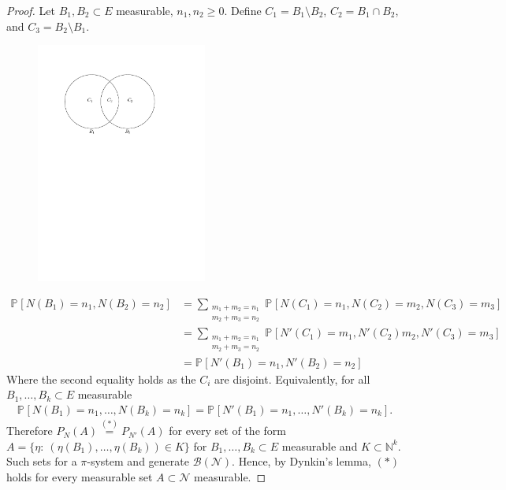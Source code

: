 \begin{proof}
Let $B_1,B_2 \subset E$ measurable, $n_1,n_2\geq 0$. Define $C_1 = B_1 \setminus B_2$, $C_2 = B_1 \cap B_2$, and $C_3= B_2 \setminus B_1$. 

\begin{figure}
	\centering
	\includegraphics[width=0.5\textwidth]{figures/intersection.pdf}
\end{figure}


\begin{align}
	\mathbb{P}_{} \left[ N(B_1)=n_1, N(B_2)=n_2 \right] &= \sum_{\substack{m_1+m_2 = n_1\\ m_2+m_3 = n_2}}^{} \mathbb{P}_{} \left[ N(C_1) = n_1, N(C_2)=m_2, N(C_3)=m_3 \right] \\ 
							    &= \sum_{\substack{m_1+m_2 = n_1\\ m_2+m_3 = n_2}}^{} \mathbb{P}_{} \left[ N'(C_1)=m_1, N'(C_2)m_2,N'(C_3)=m_3 \right] \\
							    &= \mathbb{P}_{} \left[ N'(B_1)=n_1, N'(B_2)=n_2 \right] 
\end{align}
Where the second equality holds as the $C_i$ are disjoint. Equivalently, for all $B_1,\ldots , B_k \subset E$ measurable
\begin{align}
	\mathbb{P}_{} \left[ N(B_1)=n_1,\ldots , N(B_k)=n_k \right] = \mathbb{P}_{} \left[ N'(B_1)=n_1, \ldots, N'(B_k)=n_k \right]. 
\end{align}
Therefore $P_N(A) \stackrel{(*)}{=} P_{N'}(A)$ for every set of the form $A=\{\eta: \ (\eta(B_1),\ldots ,\eta(B_k) ) \in K\}$ for $B_1,\ldots ,B_k \subset E$ measurable and $K \subset \mathbb{N}^{k}$. Such sets for a $\pi $-system and generate $\mathcal{B}(\mathcal{N})$. Hence, by Dynkin's lemma, $(*)$ holds for every measurable set $A \subset \mathcal{N}$ measurable.  
\end{proof}

